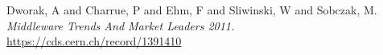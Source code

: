 \documentclass[11pt,journal,compsoc]{IEEEtran}
\begin{document}
%
%
%
\begin{thebibliography}{3}

Dworak, A and Charrue, P and Ehm, F and Sliwinski, W and Sobczak, M.
\emph{Middleware Trends And Market Leaders 2011.}
\url{https://cds.cern.ch/record/1391410}



\end{thebibliography}

% 










\end{document}
